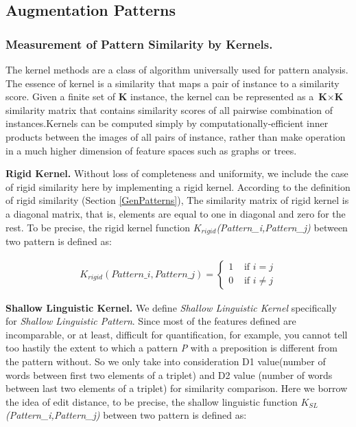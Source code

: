 \subsection{Augmentation Patterns}
\label{AugmentPatterns}

\subsubsection{Measurement of Pattern Similarity by Kernels.}
\label{SimKernels}

The kernel methods are a class of algorithm universally used for pattern analysis. The essence of kernel is a similarity that maps a pair of instance to a similarity score. Given a finite set of \textbf{K} instance, the kernel can be represented as a $\textbf{K}\times\textbf{K}$ similarity matrix that contains similarity scores of all pairwise combination of instances.Kernels can be computed simply by computationally-efficient inner products between the images of all pairs of instance, rather than make operation in a much higher dimension of feature spaces such as graphs or trees.

\textbf{Rigid Kernel.} Without loss of completeness and uniformity, we include the case of rigid similarity here by implementing a rigid kernel. According to the definition of rigid similarity (Section \ref{GenPatterns}), The similarity matrix of rigid kernel is a diagonal matrix, that is, elements are equal to one in diagonal and zero for the rest. To be precise, the rigid kernel function \emph{$K_{rigid}$(Pattern\_i,Pattern\_j)} between two pattern is defined as:

\begin{equation}
\begin{aligned}
K_{rigid}(Pattern\_i,Pattern\_j) =
\begin{cases}
 1 & \text{ if } i=j \\
 0 & \text{ if } i\neq j
\end{cases}
\end{aligned}
\end{equation}

\textbf{Shallow Linguistic Kernel. } We define \emph{Shallow Linguistic Kernel} specifically for \emph{Shallow Linguistic Pattern}. Since most of the features defined are incomparable, or at least, difficult for quantification, for example, you cannot tell too hastily the extent to which a pattern \emph{P} with a preposition is different from the pattern without. So we only take into consideration D1 value(number of words between first two elements of a triplet) and D2 value (number of words between last two elements of a triplet) for similarity comparison. Here we borrow the idea of edit distance, to be precise, the shallow linguistic function \emph{$K_{SL}$(Pattern\_i,Pattern\_j)} between two pattern is defined as:

